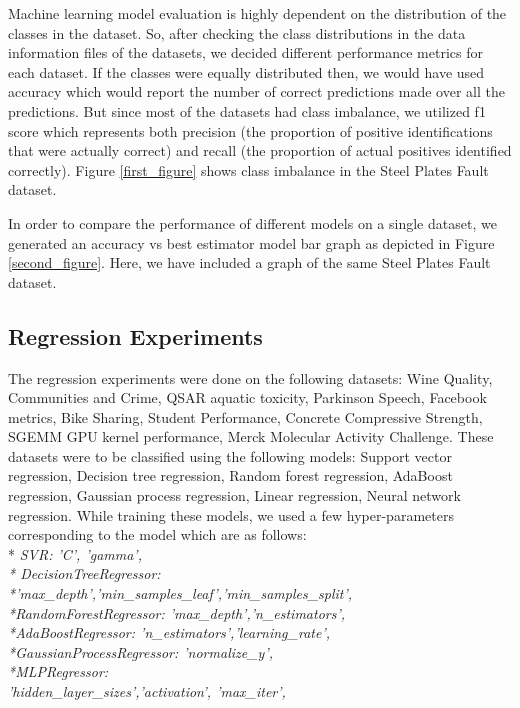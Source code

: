 \documentclass[10pt,twocolumn,letterpaper]{article}
\begin{document}
Machine learning model evaluation is highly dependent on the distribution of the classes in the dataset. So, after checking the class distributions in the data information files of the datasets, we decided different performance metrics for each dataset. If the classes were equally distributed then, we would have used accuracy which would report the number of correct predictions made over all the predictions. But since most of the datasets had class imbalance, we utilized f1 score which represents both precision (the proportion of positive identifications that were actually correct) and recall (the proportion of actual positives identified correctly). Figure \ref{first_figure} shows class imbalance in the Steel Plates Fault dataset.

In order to compare the performance of different models on a single dataset, we generated an accuracy vs best estimator model bar graph as depicted in Figure \ref{second_figure}.
Here, we have included a graph of the same Steel Plates Fault dataset.

\subsection{Regression Experiments}

The regression experiments were done on the following datasets:
Wine Quality, Communities and Crime, QSAR aquatic toxicity, Parkinson Speech, Facebook metrics, Bike Sharing, Student Performance, Concrete Compressive Strength, SGEMM GPU kernel performance, Merck Molecular Activity Challenge.
These datasets were to be classified using the following models:
Support vector regression, Decision tree regression, Random forest regression, AdaBoost regression, Gaussian process regression, Linear regression, Neural network regression.
While training these models, we used a few hyper-parameters corresponding to the model which are as follows: 
   \\*\textit{ SVR: 'C', 'gamma',
   \\* DecisionTreeRegressor:     \\*'max\_depth','min\_samples\_leaf','min\_samples\_split',
    \\*RandomForestRegressor: 'max\_depth','n\_estimators',
    \\*AdaBoostRegressor: 'n\_estimators','learning\_rate',
    \\*GaussianProcessRegressor: 'normalize\_y',
    \\*MLPRegressor:\\'hidden\_layer\_sizes','activation', 'max\_iter',}
    
\end{document}
